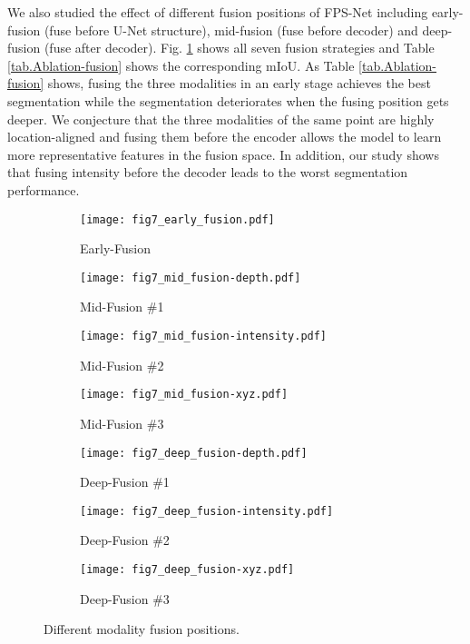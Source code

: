 \documentclass[preprint,review,3p]{elsarticle}
\begin{document}
We also studied the effect of different fusion positions of FPS-Net including early-fusion (fuse before U-Net structure), mid-fusion (fuse before decoder) and deep-fusion (fuse after decoder). 
Fig. \ref{fig.fuse} shows all seven fusion strategies and Table \ref{tab.Ablation-fusion} shows the corresponding mIoU. 
As Table \ref{tab.Ablation-fusion} shows, fusing the three modalities in an early stage achieves the best segmentation while the segmentation deteriorates when the fusing position gets deeper. 
We conjecture that the three modalities of the same point are highly location-aligned and fusing them before the encoder allows the model to learn more representative features in the fusion space. 
In addition, our study shows that fusing intensity before the decoder leads to the worst segmentation performance.

\begin{figure}
  \begin{subfigure}[b]{0.24\textwidth}
  \texttt{[image: fig7\_early\_fusion.pdf]}
  \caption{Early-Fusion}
  \end{subfigure}
  \begin{subfigure}[b]{0.24\textwidth}
  \texttt{[image: fig7\_mid\_fusion-depth.pdf]}
  \caption{Mid-Fusion \#1}
  \end{subfigure}
  \begin{subfigure}[b]{0.24\textwidth}
  \texttt{[image: fig7\_mid\_fusion-intensity.pdf]}
  \caption{Mid-Fusion \#2}
  \end{subfigure}
  \begin{subfigure}[b]{0.24\textwidth}
  \texttt{[image: fig7\_mid\_fusion-xyz.pdf]}
  \caption{Mid-Fusion \#3}
  \end{subfigure}
  
  \begin{subfigure}[b]{0.24\textwidth}
  \texttt{[image: fig7\_deep\_fusion-depth.pdf]}
  \caption{Deep-Fusion \#1}
  \end{subfigure}\begin{subfigure}[b]{0.24\textwidth}
  \texttt{[image: fig7\_deep\_fusion-intensity.pdf]}
  \caption{Deep-Fusion \#2}
  \end{subfigure}
  \begin{subfigure}[b]{0.24\textwidth}
  \texttt{[image: fig7\_deep\_fusion-xyz.pdf]}
  \caption{Deep-Fusion \#3}
  \end{subfigure}\caption{Different modality fusion positions.}\label{fig.fuse}
\end{figure}
\end{document}
